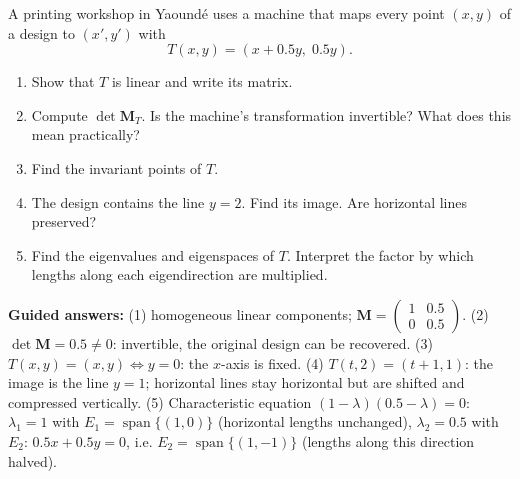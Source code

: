 \documentclass[11pt]{article}
\begin{document}
\begin{experience}
A printing workshop in Yaound\'e uses a machine that maps every point $(x,y)$ of a design to $(x', y')$ with
\[
T(x,y) = (x + 0.5y,\; 0.5y).
\]
\begin{enumerate}
    \item Show that $T$ is linear and write its matrix.
    \item Compute $\det\mathbf{M}_T$. Is the machine's transformation invertible? What does this mean practically?
    \item Find the invariant points of $T$.
    \item The design contains the line $y = 2$. Find its image. Are horizontal lines preserved?
    \item Find the eigenvalues and eigenspaces of $T$. Interpret the factor by which lengths along each eigendirection are multiplied.
\end{enumerate}
\textbf{Guided answers:} (1) homogeneous linear components; $\mathbf{M} = \begin{pmatrix}1&0.5\\0&0.5\end{pmatrix}$. (2) $\det\mathbf{M} = 0.5 \neq 0$: invertible, the original design can be recovered. (3) $T(x,y)=(x,y) \iff y = 0$: the $x$-axis is fixed. (4) $T(t,2) = (t+1, 1)$: the image is the line $y = 1$; horizontal lines stay horizontal but are shifted and compressed vertically. (5) Characteristic equation $(1-\lambda)(0.5-\lambda) = 0$: $\lambda_1 = 1$ with $E_1 = \operatorname{span}\{(1,0)\}$ (horizontal lengths unchanged), $\lambda_2 = 0.5$ with $E_2$: $0.5x + 0.5y = 0$, i.e. $E_2 = \operatorname{span}\{(1,-1)\}$ (lengths along this direction halved).
\end{experience}
\end{document}
